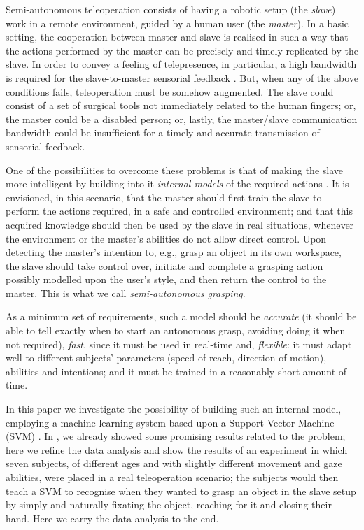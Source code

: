 Semi-autonomous teleoperation consists of having a robotic setup (the
\emph{slave}) work in a remote environment, guided by a human user
(the \emph{master}). In a basic setting, the cooperation between
master and slave is realised in such a way that the actions performed
by the master can be precisely and timely replicated by the slave. In
order to convey a feeling of telepresence, in particular, a high
bandwidth is required for the slave-to-master sensorial feedback
\cite{telesensation}. But, when any of the above conditions fails,
teleoperation must be somehow augmented. The slave could consist of a
set of surgical tools \cite{okamura} not immediately related to the
human fingers; or, the master could be a disabled person; or, lastly,
the master/slave communication bandwidth could be insufficient for a
timely and accurate transmission of sensorial feedback.

One of the possibilities to overcome these problems is that of making
the slave more intelligent by building into it \emph{internal models}
of the required actions \cite{kawato-99}. It is envisioned, in this
scenario, that the master should first train the slave to perform the
actions required, in a safe and controlled environment; and that this
acquired knowledge should then be used by the slave in real
situations, whenever the environment or the master's abilities do not
allow direct control. Upon detecting the master's intention to, e.g.,
grasp an object in its own workspace, the slave should take control
over, initiate and complete a grasping action possibly modelled upon
the user's style, and then return the control to the master. This is
what we call \emph{semi-autonomous grasping}.

As a minimum set of requirements, such a model should be
\emph{accurate} (it should be able to tell exactly when to start an
autonomous grasp, avoiding doing it when not required), \emph{fast},
since it must be used in real-time and, \emph{flexible}: it must adapt
well to different subjects' parameters (speed of reach, direction of
motion), abilities and intentions; and it must be trained in a
reasonably short amount of time.

In this paper we investigate the possibility of building such an
internal model, employing a machine learning system based upon a
Support Vector Machine (SVM) \cite{BGV92}. In \cite{clea07}, we
already showed some promising results related to the problem; here we
refine the data analysis and show the results of an experiment in
which seven subjects, of different ages and with slightly different
movement and gaze abilities, were placed in a real teleoperation
scenario; the subjects would then teach a SVM to recognise when they
wanted to grasp an object in the slave setup by simply and naturally
fixating the object, reaching for it and closing their hand. Here we
carry the data analysis to the end.

